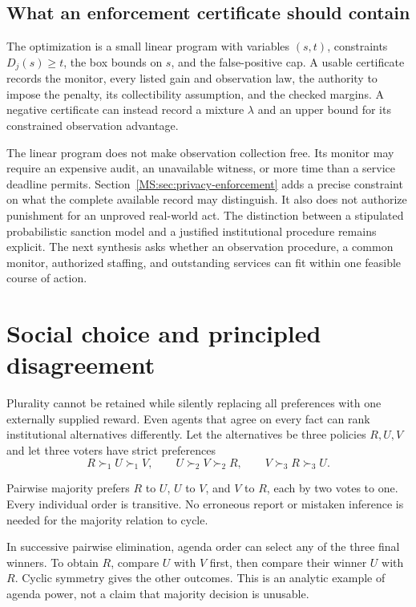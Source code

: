 \subsection{What an enforcement certificate should contain}
The optimization is a small linear program with variables $(s,t)$, constraints $D_j(s)\geq t$, the box bounds on $s$, and the false-positive cap. A usable certificate records the monitor, every listed gain and observation law, the authority to impose the penalty, its collectibility assumption, and the checked margins. A negative certificate can instead record a mixture $\lambda$ and an upper bound for its constrained observation advantage.

The linear program does not make observation collection free. Its monitor may require an expensive audit, an unavailable witness, or more time than a service deadline permits. Section~\ref{MS:sec:privacy-enforcement} adds a precise constraint on what the complete available record may distinguish. It also does not authorize punishment for an unproved real-world act. The distinction between a stipulated probabilistic sanction model and a justified institutional procedure remains explicit. The next synthesis asks whether an observation procedure, a common monitor, authorized staffing, and outstanding services can fit within one feasible course of action.
\FloatBarrier

\section{Social choice and principled disagreement}\label{MS:sec:choice}
Plurality cannot be retained while silently replacing all preferences with one externally supplied reward. Even agents that agree on every fact can rank institutional alternatives differently. Let the alternatives be three policies $R,U,V$ and let three voters have strict preferences
\[
R\succ_1 U\succ_1 V,\qquad
U\succ_2 V\succ_2 R,\qquad
V\succ_3 R\succ_3 U.
\]

\begin{MScounterexample}\label{MS:ex:majority}
Pairwise majority prefers $R$ to $U$, $U$ to $V$, and $V$ to $R$, each by two votes to one. Every individual order is transitive. No erroneous report or mistaken inference is needed for the majority relation to cycle.
\end{MScounterexample}

In successive pairwise elimination, agenda order can select any of the three final winners. To obtain $R$, compare $U$ with $V$ first, then compare their winner $U$ with $R$. Cyclic symmetry gives the other outcomes. This is an analytic example of agenda power, not a claim that majority decision is unusable.

